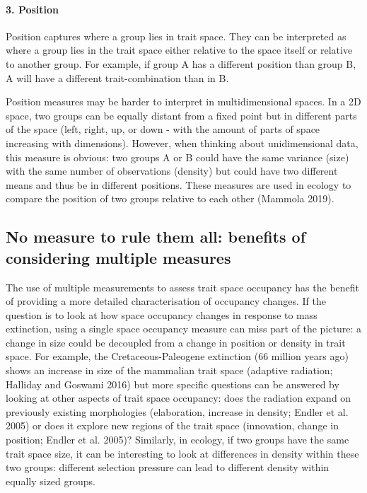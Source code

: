 \documentclass[]{article}
\let\oldparagraph\paragraph
\renewcommand{\paragraph}[1]{\oldparagraph{#1}\mbox{}}
\begin{document}
\paragraph{3. Position}\label{position}

Position captures where a group lies in trait space. They can be
interpreted as where a group lies in the trait space either relative to
the space itself or relative to another group. For example, if group A
has a different position than group B, A will have a different
trait-combination than in B.

Position measures may be harder to interpret in multidimensional spaces.
In a 2D space, two groups can be equally distant from a fixed point but
in different parts of the space (left, right, up, or down - with the
amount of parts of space increasing with dimensions). However, when
thinking about unidimensional data, this measure is obvious: two groups
A or B could have the same variance (size) with the same number of
observations (density) but could have two different means and thus be in
different positions. These measures are used in ecology to compare the
position of two groups relative to each other (Mammola 2019).

\subsection{No measure to rule them all: benefits of considering
multiple
measures}\label{no-measure-to-rule-them-all-benefits-of-considering-multiple-measures}

The use of multiple measurements to assess trait space occupancy has the
benefit of providing a more detailed characterisation of occupancy
changes. If the question is to look at how space occupancy changes in
response to mass extinction, using a single space occupancy measure can
miss part of the picture: a change in size could be decoupled from a
change in position or density in trait space. For example, the
Cretaceous-Paleogene extinction (66 million years ago) shows an increase
in size of the mammalian trait space (adaptive radiation; Halliday and
Goswami 2016) but more specific questions can be answered by looking at
other aspects of trait space occupancy: does the radiation expand on
previously existing morphologies (elaboration, increase in density;
Endler et al. 2005) or does it explore new regions of the trait space
(innovation, change in position; Endler et al. 2005)? Similarly, in
ecology, if two groups have the same trait space size, it can be
interesting to look at differences in density within these two groups:
different selection pressure can lead to different density within
equally sized groups.
\end{document}
